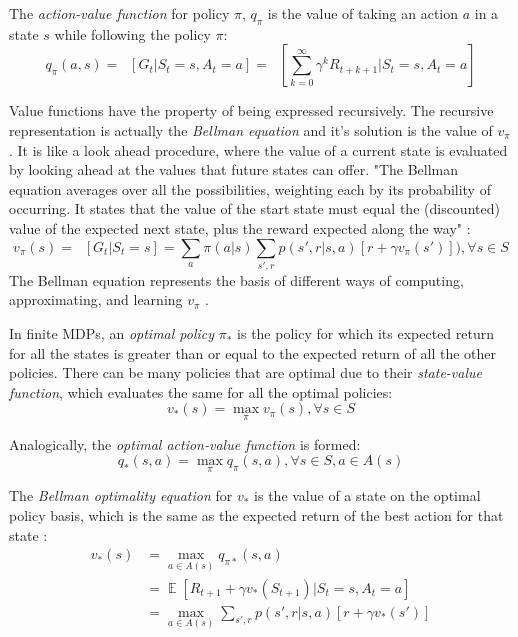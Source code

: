 The \textit{action-value function} for policy $\pi$, $q_{\pi }$ is the value of taking an action $a$ in a state $s$ while following the policy $\pi$:
\begin{equation}
q_{\pi }(a,s)=\mathop{{}\mathbb{E}_{\pi}}\left [G_{t}|S_{t}=s,A_{t}=a \right ]=\mathop{{}\mathbb{E}_{\pi}}\left [ \sum_{k=0}^{\infty}\gamma ^kR_{t+k+1} |S_{t}=s,A_{t}=a\right ]
\end{equation}

Value functions have the property of being expressed recursively. The recursive representation is actually the \textit{Bellman equation} and it's solution is the value of $v_{\pi }$. It is like a look ahead procedure, where the value of a current state is evaluated by looking ahead at the values that future states can offer. "The Bellman equation averages over all the possibilities, weighting each by its probability of occurring. It states that the value of the start state must equal the (discounted) value of the expected next state, plus the reward expected along the way" \cite{Sutton}:
\begin{equation}\label{StateValueFunction}
v_{\pi }(s)=\mathop{{}\mathbb{E}_{\pi}}\left [G_{t}|S_{t}=s \right ]=\sum_{a}\pi(a|s)\sum_{s',r}p(s',r|s,a)\left [ r+\gamma v_{\pi }(s') \right ]), \forall s\in S
\end{equation}
The Bellman equation represents the basis of different ways of computing, approximating, and learning $v_{\pi }$ \cite{Sutton}.

In finite MDPs, an \textit{optimal policy} $\pi_{*}$ is the policy for which its expected return for all the states is greater than or equal to the expected return of all the other policies. There can be many policies that are optimal due to their \textit{state-value function}, which evaluates the same for all the optimal policies:\begin{equation}
v_{*}(s)=\max_{\pi}v_{\pi}(s), \forall s\in S
\end{equation}

Analogically, the \textit{optimal action-value function} is formed:
\begin{equation}
q_{*}(s,a)=\max_{\pi}q_{\pi}(s,a), \forall s\in S , a \in A(s)
\end{equation}

The \textit{Bellman optimality equation} for $v_{*}$ is the value of a state on the optimal policy basis, which is the same as the expected return of the best action for that state \cite{Sutton}:
\begin{equation}\label{BellmanOptimalityVstar}
\begin{split}
v_{*}(s)&=\max_{a \in A(s)}q_{\pi*}(s,a) \\
&=\mathop{{}\mathbb{E}}\left [ R_{t+1} + \gamma v_{*}(S_{t+1})|S_{t}=s, A_{t}=a  \right ] \\
&=\max_{a \in A(s)}\sum_{s',r}p(s',r|s,a)\left [ r+\gamma v_{*}(s') \right ]
\end{split}
\end{equation}

